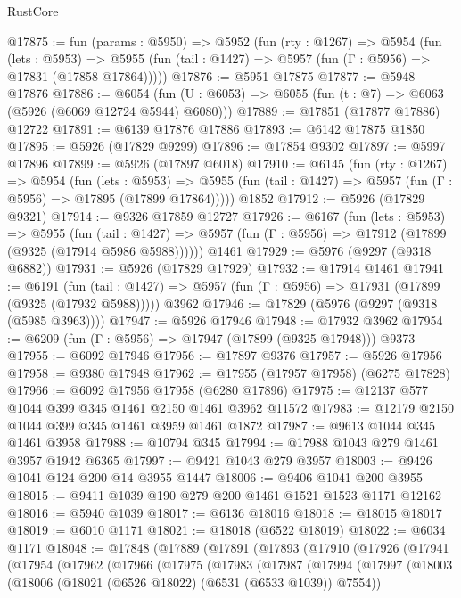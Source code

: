 \begin{lexlean}{RustCore}
\begin{coremodule}
@17875 := fun (params : @5950) =>
  @5952
    (fun (rty : @1267) =>
    @5954
      (fun (lets : @5953) =>
      @5955 (fun (tail : @1427) => @5957 (fun (Γ : @5956) => @17831 (@17858 @17864)))))
@17876 := @5951 @17875
@17877 := @5948 @17876
@17886 := @6054
    (fun (U : @6053) => @6055 (fun (t : @7) => @6063 (@5926 (@6069 @12724 @5944) @6080)))
@17889 := @17851 (@17877 @17886) @12722
@17891 := @6139 @17876 @17886
@17893 := @6142 @17875 @1850
@17895 := @5926 (@17829 @9299)
@17896 := @17854 @9302
@17897 := @5997 @17896
@17899 := @5926 (@17897 @6018)
@17910 := @6145
    (fun (rty : @1267) =>
    @5954
      (fun (lets : @5953) =>
      @5955 (fun (tail : @1427) => @5957 (fun (Γ : @5956) => @17895 (@17899 @17864)))))
    @1852
@17912 := @5926 (@17829 @9321)
@17914 := @9326 @17859 @12727
@17926 := @6167
    (fun (lets : @5953) =>
    @5955
      (fun (tail : @1427) =>
      @5957 (fun (Γ : @5956) => @17912 (@17899 (@9325 (@17914 @5986 @5988))))))
    @1461
@17929 := @5976 (@9297 (@9318 @6882))
@17931 := @5926 (@17829 @17929)
@17932 := @17914 @1461
@17941 := @6191
    (fun (tail : @1427) => @5957 (fun (Γ : @5956) => @17931 (@17899 (@9325 (@17932 @5988)))))
    @3962
@17946 := @17829 (@5976 (@9297 (@9318 (@5985 @3963))))
@17947 := @5926 @17946
@17948 := @17932 @3962
@17954 := @6209 (fun (Γ : @5956) => @17947 (@17899 (@9325 @17948))) @9373
@17955 := @6092 @17946
@17956 := @17897 @9376
@17957 := @5926 @17956
@17958 := @9380 @17948
@17962 := @17955 (@17957 @17958) (@6275 @17828)
@17966 := @6092 @17956 @17958 (@6280 @17896)
@17975 := @12137 @577 @1044 @399 @345 @1461 @2150 @1461 @3962 @11572
@17983 := @12179 @2150 @1044 @399 @345 @1461 @3959 @1461 @1872
@17987 := @9613 @1044 @345 @1461 @3958
@17988 := @10794 @345
@17994 := @17988 @1043 @279 @1461 @3957 @1942 @6365
@17997 := @9421 @1043 @279 @3957
@18003 := @9426 @1041 @124 @200 @14 @3955 @1447
@18006 := @9406 @1041 @200 @3955
@18015 := @9411 @1039 @190 @279 @200 @1461 @1521 @1523 @1171 @12162
@18016 := @5940 @1039
@18017 := @6136 @18016
@18018 := @18015 @18017
@18019 := @6010 @1171
@18021 := @18018 (@6522 @18019)
@18022 := @6034 @1171
@18048 := @17848
    (@17889
      (@17891
        (@17893
          (@17910
            (@17926
              (@17941
                (@17954
                  (@17962
                    (@17966
                      (@17975
                        (@17983
                          (@17987
                            (@17994
                              (@17997
                                (@18003
                                  (@18006 (@18021 (@6526 @18022) (@6531 (@6533 @1039)) @7554))

\end{coremodule}
\end{lexlean}

